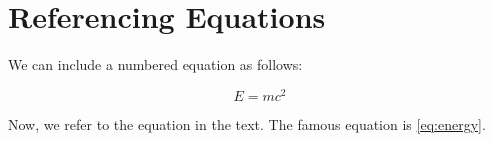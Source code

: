 \documentclass{article}
\begin{document}
\section{Referencing Equations}
		
	We can include a numbered equation as follows:
	
	\begin{equation}
		E = mc^2
		\label{eq:energy}
	\end{equation}
	
	Now, we refer to the equation in the text. The famous equation is \ref{eq:energy}.
		
\end{document}
